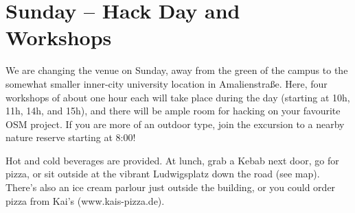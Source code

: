 \ClearWallPaper

\cropmarkswallpaper

\newpage
{}
\thispagestyle{empty}
\section*{Sunday -- Hack Day and Workshops}

We are changing the venue on Sunday, away from the green of
the campus to the somewhat smaller inner-city university
location in Amalienstraße. Here, 
four workshops of about
one hour each will take place during the day (starting at 10h,
11h, 14h, and 15h), and there will be ample room for
hacking on your favourite OSM project. If you are more of an
outdoor type, join the excursion to a nearby nature reserve
starting at 8:00!

Hot and cold beverages are provided. At lunch, 
grab a Kebab next door, go for pizza, or sit outside at
the vibrant Ludwigsplatz down the road (see map). There's also an ice cream parlour just outside the
building, or you could order pizza from Kai's (www.kais-pizza.de).
\cropmarkswallpaper
